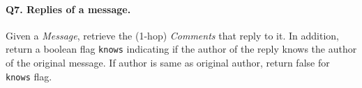 \paragraph{\textbf{Q7}. Replies of a message.}
Given a \emph{Message}, retrieve the (1-hop) \emph{Comments} that reply
to it.
In addition, return a boolean flag \texttt{knows} indicating if the
author of the reply knows the author of the original message. If author
is same as original author, return false for \texttt{knows} flag.
